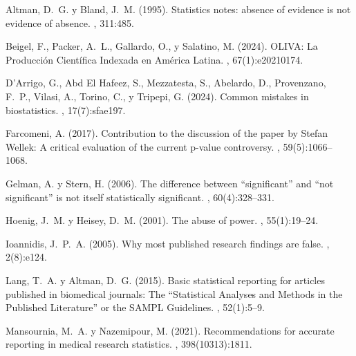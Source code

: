 \begin{thebibliography}{}

Altman, D.~G. y Bland, J.~M. (1995).
\newblock Statistics notes: absence of evidence is not evidence of absence.
, 311:485.

Beigel, F., Packer, A.~L., Gallardo, O., y Salatino, M. (2024).
\newblock OLIVA: La Producción Científica Indexada en América Latina.
, 67(1):e20210174.

D'Arrigo, G., Abd El Hafeez, S., Mezzatesta, S., Abelardo, D., Provenzano, F.~P., Vilasi, A., Torino, C., y Tripepi, G. (2024).
\newblock Common mistakes in biostatistics.
, 17(7):sfae197.

Farcomeni, A. (2017).
\newblock Contribution to the discussion of the paper by Stefan Wellek: A critical evaluation of the current p-value controversy.
, 59(5):1066--1068.

Gelman, A. y Stern, H. (2006).
\newblock The difference between ``significant'' and ``not significant'' is not itself statistically significant.
, 60(4):328--331.

Hoenig, J.~M. y Heisey, D.~M. (2001).
\newblock The abuse of power.
, 55(1):19--24.

Ioannidis, J.~P.~A. (2005).
\newblock Why most published research findings are false.
, 2(8):e124.

Lang, T.~A. y Altman, D.~G. (2015).
\newblock Basic statistical reporting for articles published in biomedical journals: The ``Statistical Analyses and Methods in the Published Literature'' or the {SAMPL} Guidelines.
, 52(1):5--9.

Mansournia, M.~A. y Nazemipour, M. (2021).
\newblock Recommendations for accurate reporting in medical research statistics.
, 398(10313):1811.


\end{thebibliography}
